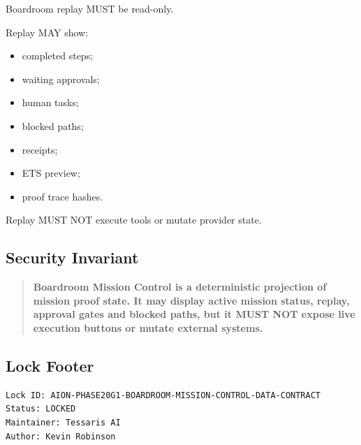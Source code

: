 Boardroom replay MUST be read-only.

Replay MAY show:

\begin{itemize}
  \item completed steps;
  \item waiting approvals;
  \item human tasks;
  \item blocked paths;
  \item receipts;
  \item ETS preview;
  \item proof trace hashes.
\end{itemize}

Replay MUST NOT execute tools or mutate provider state.

\subsection{Security Invariant}

\begin{quote}
\textbf{Boardroom Mission Control is a deterministic projection of mission proof state. It may display active mission status, replay, approval gates and blocked paths, but it MUST NOT expose live execution buttons or mutate external systems.}
\end{quote}

\subsection{Lock Footer}

\begin{verbatim}
Lock ID: AION-PHASE20G1-BOARDROOM-MISSION-CONTROL-DATA-CONTRACT
Status: LOCKED
Maintainer: Tessaris AI
Author: Kevin Robinson
\end{verbatim}
